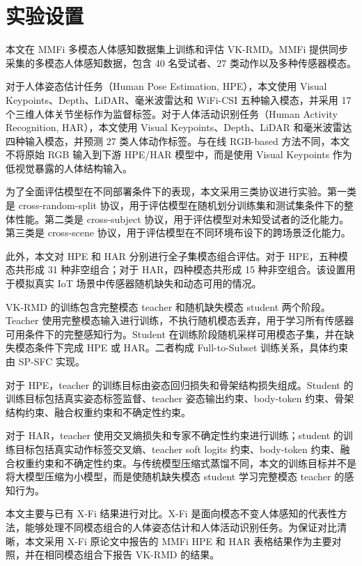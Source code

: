 \documentclass[journal]{IEEEtran}
\newcommand{\parahead}[1]{\vspace{0.4em}\noindent{\textbf{#1}}}
\begin{document}
\section{实验设置}

\parahead{数据集与任务。}
本文在 MMFi 多模态人体感知数据集上训练和评估 VK-RMD。MMFi 提供同步采集的多模态人体感知数据，包含 40 名受试者、27 类动作以及多种传感器模态。

对于人体姿态估计任务（Human Pose Estimation, HPE），本文使用 Visual Keypoints、Depth、LiDAR、毫米波雷达和 WiFi-CSI 五种输入模态，并采用 17 个三维人体关节坐标作为监督标签。对于人体活动识别任务（Human Activity Recognition, HAR），本文使用 Visual Keypoints、Depth、LiDAR 和毫米波雷达四种输入模态，并预测 27 类人体动作标签。与在线 RGB-based 方法不同，本文不将原始 RGB 输入到下游 HPE/HAR 模型中，而是使用 Visual Keypoints 作为低视觉暴露的人体结构输入。

为了全面评估模型在不同部署条件下的表现，本文采用三类协议进行实验。第一类是 cross-random-split 协议，用于评估模型在随机划分训练集和测试集条件下的整体性能。第二类是 cross-subject 协议，用于评估模型对未知受试者的泛化能力。第三类是 cross-scene 协议，用于评估模型在不同环境布设下的跨场景泛化能力。

此外，本文对 HPE 和 HAR 分别进行全子集模态组合评估。对于 HPE，五种模态共形成 31 种非空组合；对于 HAR，四种模态共形成 15 种非空组合。该设置用于模拟真实 IoT 场景中传感器随机缺失和动态可用的情况。

\parahead{训练目标。}
VK-RMD 的训练包含完整模态 teacher 和随机缺失模态 student 两个阶段。Teacher 使用完整模态输入进行训练，不执行随机模态丢弃，用于学习所有传感器可用条件下的完整感知行为。Student 在训练阶段随机采样可用模态子集，并在缺失模态条件下完成 HPE 或 HAR。二者构成 Full-to-Subset 训练关系，具体约束由 SP-SFC 实现。

对于 HPE，teacher 的训练目标由姿态回归损失和骨架结构损失组成。Student 的训练目标包括真实姿态标签监督、teacher 姿态输出约束、body-token 约束、骨架结构约束、融合权重约束和不确定性约束。

对于 HAR，teacher 使用交叉熵损失和专家不确定性约束进行训练；student 的训练目标包括真实动作标签交叉熵、teacher soft logits 约束、body-token 约束、融合权重约束和不确定性约束。与传统模型压缩式蒸馏不同，本文的训练目标并不是将大模型压缩为小模型，而是使随机缺失模态 student 学习完整模态 teacher 的感知行为。

\parahead{对比方法。}
本文主要与已有 X-Fi 结果进行对比。X-Fi 是面向模态不变人体感知的代表性方法，能够处理不同模态组合的人体姿态估计和人体活动识别任务。为保证对比清晰，本文采用 X-Fi 原论文中报告的 MMFi HPE 和 HAR 表格结果作为主要对照，并在相同模态组合下报告 VK-RMD 的结果。
\end{document}
